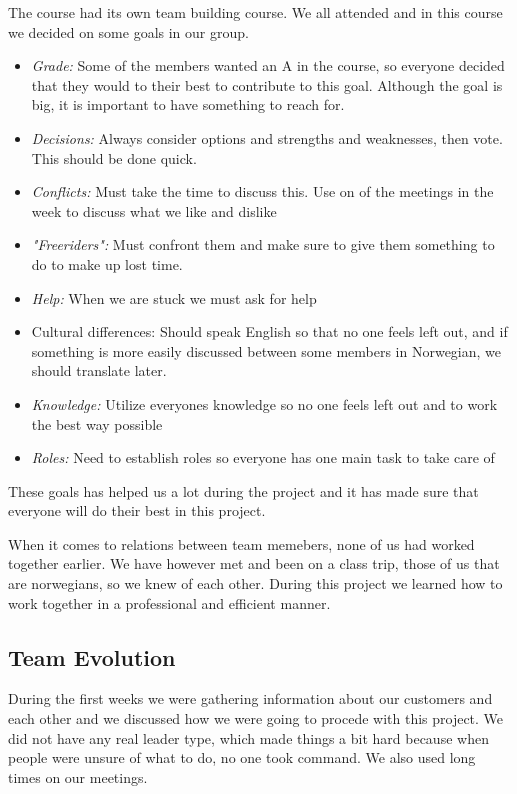 \documentclass{report}
\begin{document}
The course had its own team building course. We all attended and in this course we decided on some goals in our group.
\begin{itemize}
\item \emph{Grade:} Some of the members wanted an A in the course, so everyone decided that they would to their best to contribute to this goal. Although the goal is big, it is important to have something to reach for.
\item \emph{Decisions:} Always consider options and strengths and weaknesses, then vote. This should be done quick.
\item \emph{Conflicts:} Must take the time to discuss this. Use on of the meetings in the week to discuss what we like and dislike
\item \emph{"Freeriders":} Must confront them and make sure to give them something to do to make up lost time.
\item \emph{Help:} When we are stuck we must ask for help
\item Cultural differences: Should speak English so that no one feels left out, and if something is more easily discussed between some members in Norwegian, we should translate later.
\item \emph{Knowledge:} Utilize everyones knowledge so no one feels left out and to work the best way possible
\item \emph{Roles:} Need to establish roles so everyone has one main task to take care of
\end{itemize}
These goals has helped us a lot during the project and it has made sure that everyone will do their best in this project.

When it comes to relations between team memebers, none of us had worked together earlier. We have however met and been on a class trip, those of us that are norwegians, so we knew of each other. During this project we learned how to work together in a professional and efficient manner.

\subsection{Team Evolution} \label{subsec:team_evo}
During the first weeks we were gathering information about our customers and each other and we discussed how we were going to procede with this project. We did not have any real leader type, which made things a bit hard because when people were unsure of what to do, no one took command. We also used long times on our meetings.
\end{document}
